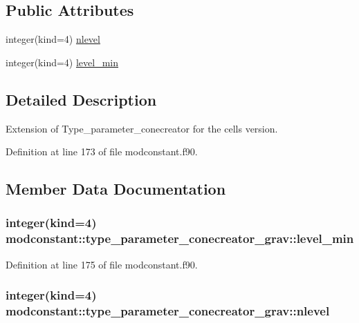 \subsection*{Public Attributes}
\begin{DoxyCompactItemize}
\item 
integer(kind=4) \hyperlink{structmodconstant_1_1type__parameter__conecreator__grav_a5fbac0f79f7eadfc59bd86d9b40598df}{nlevel}
\item 
integer(kind=4) \hyperlink{structmodconstant_1_1type__parameter__conecreator__grav_abb5a029d461015766a5d9556109a3623}{level\-\_\-min}
\end{DoxyCompactItemize}


\subsection{Detailed Description}
Extension of Type\-\_\-parameter\-\_\-conecreator for the cells version. 

Definition at line 173 of file modconstant.\-f90.



\subsection{Member Data Documentation}
\hypertarget{structmodconstant_1_1type__parameter__conecreator__grav_abb5a029d461015766a5d9556109a3623}{
\subsubsection[{level\-\_\-min}]{\setlength{\rightskip}{0pt plus 5cm}integer(kind=4) modconstant\-::type\-\_\-parameter\-\_\-conecreator\-\_\-grav\-::level\-\_\-min}}\label{structmodconstant_1_1type__parameter__conecreator__grav_abb5a029d461015766a5d9556109a3623}


Definition at line 175 of file modconstant.\-f90.

\hypertarget{structmodconstant_1_1type__parameter__conecreator__grav_a5fbac0f79f7eadfc59bd86d9b40598df}{
\subsubsection[{nlevel}]{\setlength{\rightskip}{0pt plus 5cm}integer(kind=4) modconstant\-::type\-\_\-parameter\-\_\-conecreator\-\_\-grav\-::nlevel}}\label{structmodconstant_1_1type__parameter__conecreator__grav_a5fbac0f79f7eadfc59bd86d9b40598df}


